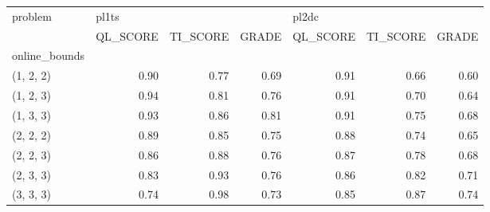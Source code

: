 \begin{tabular}{lrrrrrr}
\toprule
problem & \multicolumn{3}{l}{pl1ts} & \multicolumn{3}{l}{pl2dc} \\
{} & QL\_SCORE & TI\_SCORE & GRADE & QL\_SCORE & TI\_SCORE & GRADE \\
online\_bounds &          &          &       &          &          &       \\
\midrule
(1, 2, 2)     &     0.90 &     0.77 &  0.69 &     0.91 &     0.66 &  0.60 \\
(1, 2, 3)     &     0.94 &     0.81 &  0.76 &     0.91 &     0.70 &  0.64 \\
(1, 3, 3)     &     0.93 &     0.86 &  0.81 &     0.91 &     0.75 &  0.68 \\
(2, 2, 2)     &     0.89 &     0.85 &  0.75 &     0.88 &     0.74 &  0.65 \\
(2, 2, 3)     &     0.86 &     0.88 &  0.76 &     0.87 &     0.78 &  0.68 \\
(2, 3, 3)     &     0.83 &     0.93 &  0.76 &     0.86 &     0.82 &  0.71 \\
(3, 3, 3)     &     0.74 &     0.98 &  0.73 &     0.85 &     0.87 &  0.74 \\
\bottomrule
\end{tabular}
